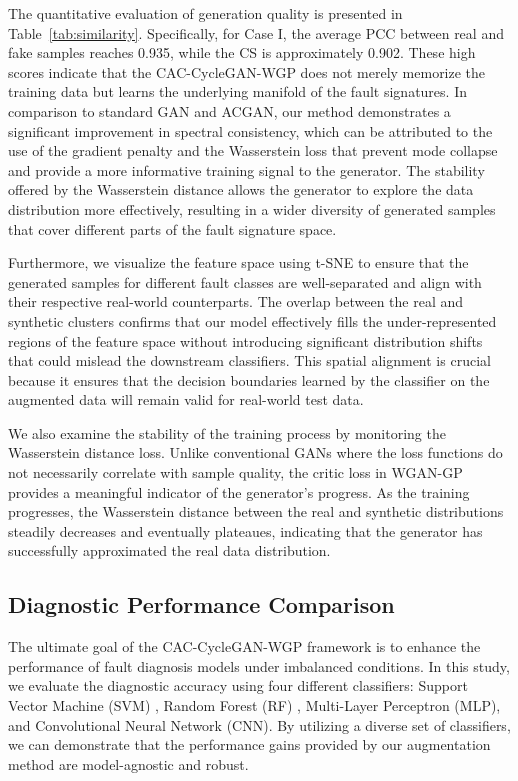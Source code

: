 \documentclass[conference,twocolumn]{IEEEtran}
\begin{document}
The quantitative evaluation of generation quality is presented in  Table~\ref{tab:similarity}. Specifically, for Case I, the average PCC between real and fake samples reaches 0.935, while the CS is approximately 0.902. These high scores indicate that the CAC-CycleGAN-WGP does not merely memorize the training data but learns the underlying manifold of the fault signatures. In comparison to standard GAN and ACGAN, our method demonstrates a significant improvement in spectral consistency, which can be attributed to the use of the gradient penalty and the Wasserstein loss that prevent mode collapse and provide a more informative training signal to the generator. The stability offered by the Wasserstein distance allows the generator to explore the data distribution more effectively, resulting in a wider diversity of generated samples that cover different parts of the fault signature space.

Furthermore, we visualize the feature space using t-SNE \cite{Maaten2008} to ensure that the generated samples for different fault classes are well-separated and align with their respective real-world counterparts. The overlap between the real and synthetic clusters confirms that our model effectively fills the under-represented regions of the feature space without introducing significant distribution shifts that could mislead the downstream classifiers. This spatial alignment is crucial because it ensures that the decision boundaries learned by the classifier on the augmented data will remain valid for real-world test data.

We also examine the stability of the training process by monitoring the Wasserstein distance loss. Unlike conventional GANs where the loss functions do not necessarily correlate with sample quality, the critic loss in WGAN-GP provides a meaningful indicator of the generator's progress. As the training progresses, the Wasserstein distance between the real and synthetic distributions steadily decreases and eventually plateaues, indicating that the generator has successfully approximated the real data distribution.

\subsection{Diagnostic Performance Comparison}
The ultimate goal of the CAC-CycleGAN-WGP framework is to enhance the performance of fault diagnosis models under imbalanced conditions. In this study, we evaluate the diagnostic accuracy using four different classifiers: Support Vector Machine (SVM) \cite{Cortes1995}, Random Forest (RF) \cite{Breiman2001}, Multi-Layer Perceptron (MLP), and Convolutional Neural Network (CNN). By utilizing a diverse set of classifiers, we can demonstrate that the performance gains provided by our augmentation method are model-agnostic and robust.
\end{document}
